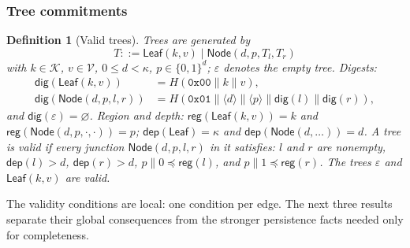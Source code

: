 \documentclass[twocolumn]{article}
\newtheorem{definition}{Definition}
\begin{document}
\subsubsection{Tree commitments}

\begin{definition}[Valid trees]
\label{def:tree}
Trees are generated by
\[ T ::= \mathsf{Leaf}(k, v) \mid \mathsf{Node}(d, p, T_l, T_r) \]
with $k \in \mathcal{K}$, $v \in \mathcal{V}$, $0 \le d < \kappa$, $p \in \{0,1\}^{d}$; $\varepsilon$ denotes the empty tree. Digests:
\begin{align*}
\mathsf{dig}(\mathsf{Leaf}(k,v)) &= H(\texttt{0x00} \| k \| v),\\
\mathsf{dig}(\mathsf{Node}(d,p,l,r)) &= H(\texttt{0x01} \| \langle d\rangle \| \langle p\rangle \| \mathsf{dig}(l) \| \mathsf{dig}(r)),
\end{align*}
and $\mathsf{dig}(\varepsilon) = \varnothing$. Region and depth: $\mathsf{reg}(\mathsf{Leaf}(k,v)) = k$ and $\mathsf{reg}(\mathsf{Node}(d,p,\cdot,\cdot)) = p$; $\mathsf{dep}(\mathsf{Leaf}) = \kappa$ and $\mathsf{dep}(\mathsf{Node}(d,\ldots)) = d$. A tree is \emph{valid} if every junction $\mathsf{Node}(d,p,l,r)$ in it satisfies: $l$ and $r$ are nonempty, $\mathsf{dep}(l) > d$, $\mathsf{dep}(r) > d$, $p\|0 \preceq \mathsf{reg}(l)$, and $p\|1 \preceq \mathsf{reg}(r)$. The trees $\varepsilon$ and $\mathsf{Leaf}(k,v)$ are valid.
\end{definition}

The validity conditions are local: one condition per edge. The next three results separate their global consequences from the stronger persistence facts needed only for completeness.
\end{document}
